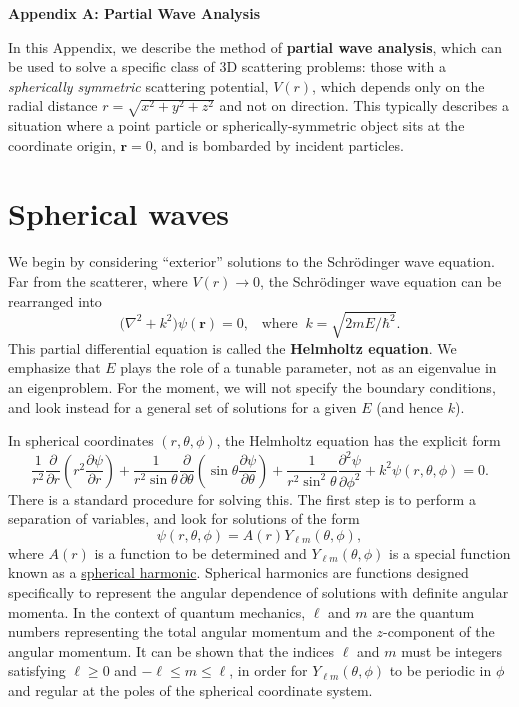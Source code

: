 \documentclass[pra,12pt]{revtex4}
\begin{document}
\begin{center}
{\large \textbf{Appendix A: Partial Wave Analysis}}
\end{center}

In this Appendix, we describe the method of \textbf{partial wave
  analysis}, which can be used to solve a specific class of 3D
scattering problems: those with a \textit{spherically symmetric}
scattering potential, $V(r)$, which depends only on the radial
distance $r = \sqrt{x^2 + y^2 + z^2}$ and not on direction.  This
typically describes a situation where a point particle or
spherically-symmetric object sits at the coordinate origin,
$\mathbf{r} = 0$, and is bombarded by incident particles.

\section{Spherical waves}
\label{sec:spherical}

We begin by considering ``exterior'' solutions to the Schr\"odinger
wave equation.  Far from the scatterer, where $V(r) \rightarrow 0$,
the Schr\"odinger wave equation can be rearranged into
$$\Big(\nabla^2 + k^2\Big) \psi(\mathbf{r}) = 0,\;\;\;\mathrm{where}\;\;k = \sqrt{2mE/\hbar^2}.$$
This partial differential equation is called the \textbf{Helmholtz
  equation}.  We emphasize that $E$ plays the role of a tunable
parameter, not as an eigenvalue in an eigenproblem.  For the moment,
we will not specify the boundary conditions, and look instead for a
general set of solutions for a given $E$ (and hence $k$).

In spherical coordinates $(r,\theta,\phi)$, the Helmholtz equation has
the explicit form
$$\frac{1}{r^2}\frac{\partial}{\partial r}\left(r^2\frac{\partial \psi}{\partial r}\right) + \frac{1}{r^2\sin\theta}\frac{\partial}{\partial\theta}\left(\sin\theta\frac{\partial\psi}{\partial\theta}\right)+\frac{1}{r^2\sin^2\theta}\frac{\partial^2\psi}{\partial\phi^2} + k^2\psi(r,\theta,\phi) = 0.$$
There is a standard procedure for solving this.  The first step is to
perform a separation of variables, and look for solutions of the form
$$\psi(r,\theta,\phi) = A(r) Y_{\ell m}(\theta,\phi),$$
where $A(r)$ is a function to be determined and $Y_{\ell
  m}(\theta,\phi)$ is a special function known as a
\href{https://en.wikipedia.org/wiki/Spherical_harmonics}{spherical
  harmonic}.  Spherical harmonics are functions designed specifically
to represent the angular dependence of solutions with definite angular
momenta.  In the context of quantum mechanics, $\ell$ and $m$ are the
quantum numbers representing the total angular momentum and the
$z$-component of the angular momentum.  It can be shown that the
indices $\ell$ and $m$ must be integers satisfying $\ell \ge 0$ and
$-\ell\le m \le \ell$, in order for $Y_{\ell m}(\theta,\phi)$ to be
periodic in $\phi$ and regular at the poles of the spherical
coordinate system.
\end{document}
